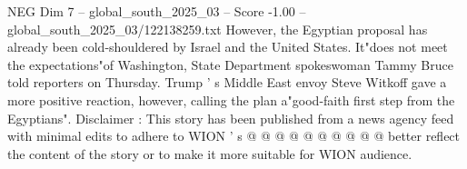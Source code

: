 \begin{textsample}{NEG Dim 7 – global\_south\_2025\_03 – Score -1.00 – global\_south\_2025\_03/122138259.txt}
However, the Egyptian proposal has already been cold-shouldered by Israel and the United States.
It"does not meet the expectations"of Washington, State Department spokeswoman Tammy Bruce told reporters on Thursday.
Trump ' s Middle East envoy Steve Witkoff gave a more positive reaction, however, calling the plan a"good-faith first step from the Egyptians".
Disclaimer : This story has been published from a news agency feed with minimal edits to adhere to WION ' s @ @ @ @ @ @ @ @ @ @ better reflect the content of the story or to make it more suitable for WION audience.

\end{textsample}

